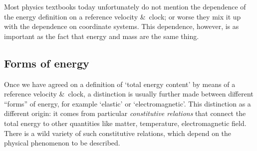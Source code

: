 \documentclass[a4paper,12pt,%
onecolumn,oneside,titlepage,%
british%
]{memoir}
\newcommand*{\amp}{\&}
\renewcommand*{\|}[1][]{\nonscript\:#1\vert\nonscript\:\mathopen{}}
\begin{document}
\begin{warning}
  Most physics textbooks today unfortunately do not mention the dependence of the energy definition on a reference velocity \amp\ clock; or worse they mix it up with the dependence on coordinate systems. This dependence, however, is as important as the fact that energy and mass are the same thing.
\end{warning}

\subsection{Forms of energy}
\label{sec:energy_forms}

Once we have agreed on a definition of \enquote*{total energy content} by means of a  reference velocity \amp\ clock, a distinction is usually further made between different \enquote{forms} of energy,
for example \enquote*{elastic} or \enquote*{electromagnetic}. This distinction as a different origin: it comes from particular \emph{constitutive relations} that connect the total energy to other quantities like matter, temperature, electromagnetic field. There is a wild variety of such constitutive relations, which depend on the physical phenomenon to be described.
\end{document}
